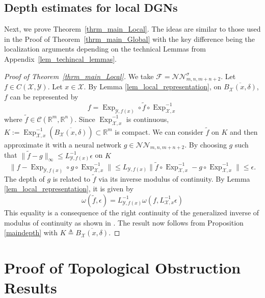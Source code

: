 \documentclass[anon,12pt]{colt2021} %
\newcommand{\xxx}{\mathcal{X}}
\newcommand{\yyy}{\mathcal{Y}}
\begin{document}
\subsection{Depth estimates for local DGNs}
Next, we prove Theorem~\ref{thrm_main_Local}.  The ideas are similar to those used in the Proof of Theorem~\ref{thrm_main_Global} with the key difference being the localization arguments depending on the technical Lemmas from Appendix~\ref{lem_techincal_lemmas}.  
\begin{proof}[{Proof of Theorem~\ref{thrm_main_Local}}]
We take $\mathcal{F}=\mathcal{NN}_{m,n,m+n+2}^{\sigma}$. Let $f \in C(\xxx,\yyy)$. Let $x \in \xxx$. By Lemma \ref{lem_local_representation}, on $\overline{B_{\xxx}(x,\delta)}$, $f$ can be represented by
\begin{equation*}
    f = \operatorname{Exp}_{\yyy,f(x)} \circ \tilde f \circ \operatorname{Exp}_{\xxx,x}^{-1} 
\end{equation*}
where $\tilde f \in \mathcal{C}(\mathbb{R}^{m}, \mathbb{R}^{n})$. Since $\operatorname{Exp}_{\xxx,x}^{-1}$ is continuous, $K:=\operatorname{Exp}_{\xxx,x}^{-1}(\overline{B_{\xxx}(x,\delta)}) \subset \mathbb{R}^{m}$ is compact. We can consider $\tilde f$ on $K$ and then approximate it with a neural network $g \in \mathcal{NN}_{m,n,m+n+2}$. By choosing $g$ such that $\| \tilde f - g \|_{\infty} \leq  L_{\yyy,f(x)}^{-1} \epsilon$ on $K$
\begin{equation*}
    \| f - \operatorname{Exp}_{\yyy,f(x)} \circ g \circ \operatorname{Exp}_{\xxx,x}^{-1}\| \leq L_{\yyy,f(x)} \| \tilde f \circ \operatorname{Exp}_{\xxx,x}^{-1} - g \circ \operatorname{Exp}_{\xxx,x}^{-1} \| \leq \epsilon.
\end{equation*}
The depth of $g$ is related to $\tilde f$ via its inverse modulus of continuity. By Lemma \ref{lem_local_representation}, it is given by
\begin{equation*}
    \omega(\tilde{f},\epsilon) = 
    L_{\yyy,f(x)}^{-1}\omega\left(
    f,L_{\xxx,x}^{-1}\epsilon
    \right) 
\end{equation*}
This equality is a consequence of the right continuity of the generalized inverse of modulus of continuity as shown in \cite{EmbrechtsHofert}. The result now follows from Proposition \ref{maindepth} with $K\triangleq \overline{B_{\xxx}(x,\delta)}$.
\end{proof}

\section{Proof of Topological Obstruction Results}\label{s_Appendix_Obstruction_Proofs}
\end{document}
